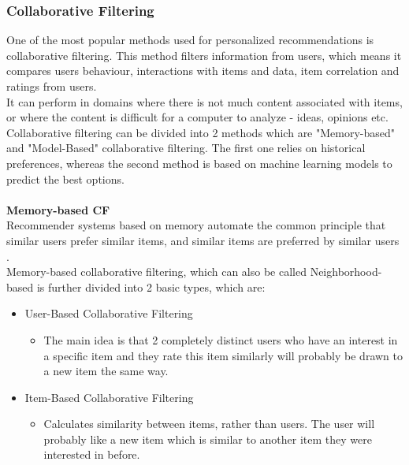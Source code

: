 \documentclass[\myFontSize,a4paper,oneside,english,hidelinks]{article}
\begin{document}
\subsubsection{Collaborative Filtering}
One of the most popular methods used for personalized recommendations is collaborative filtering. This method filters information from users, which means it compares users behaviour, interactions with items and data, item correlation and ratings from users. \\
It can perform in domains where there is not much content associated with items, or where the content is difficult for a computer to analyze - ideas, opinions etc.\cite{melville:aaai02}\\
Collaborative filtering can be divided into 2 methods which are "Memory-based" and "Model-Based" collaborative filtering. The first one relies on historical preferences, whereas the second method is based on machine learning models to predict the best options.\\\\
%
\textbf{Memory-based CF}\\
Recommender systems based on memory automate the common principle that similar users prefer similar items, and similar items are preferred by similar users \cite{Ning201537}. \\
Memory-based collaborative filtering, which can also be called Neighborhood-based is further divided into 2 basic types, which are:
\begin{itemize}
\item User-Based Collaborative Filtering
	\begin{itemize}
	\item The main idea is that 2 completely distinct users who have an interest in a specific item and they rate this item similarly will probably be drawn to a new item the same way.
	\end{itemize}
\item Item-Based Collaborative Filtering
	\begin{itemize}
	\item Calculates similarity between items, rather than users. The user will probably like a new item which is similar to another item they were interested in before.\\
	\end{itemize}
\end{itemize}
%
%
\end{document}
